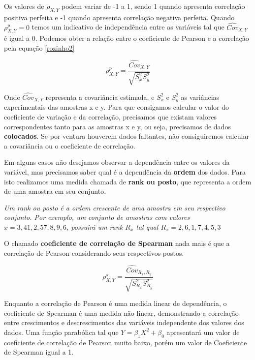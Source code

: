  Os valores de $\rho_{X,Y}$ podem variar de -1 a 1, sendo 1 quando apresenta correlação positiva perfeita e -1 quando apresenta correlação negativa perfeita. Quando $\rho_{X,Y}^{p} = 0$ temos um indicativo de independência entre as variáveis tal que $\hat{Cov}_{X,Y}$ é igual a 0. Podemos obter a relação entre o coeficiente de Pearson e a correlação pela equação \eqref{rozinho2}
 
 \begin{equation}\label{rozinho2}
 \rho_{X,Y}^{p} = \frac{\hat{Cov}_{X,Y}}{\sqrt{S_{x}^{2} S_{y}^{2}}} 
 \end{equation}
 
 Onde $\hat{Cov}_{X,Y}$ representa a covariância estimada, e $S_{x}^{2}$ e $S_{y}^{2}$ as variâncias experimentais das amostras x e y. Para que consigamos calcular o valor do coeficiente de variação e da correlação, precisamos que existam valores correspondentes tanto para as amostras x e y, ou seja, precisamos de dados \textbf{colocados}. Se por ventura houverem dados faltantes, não consiguiremos calcular a covariância ou o coeficiente de correlação. 
 
 Em alguns casos não desejamos observar a dependência entre os valores da variável, mas precisamos saber qual é a dependência da \textbf{ordem} dos dados. Para isto realizamos uma medida chamada de \textbf{rank ou posto}, que representa a ordem de uma amostra em seu conjunto. 
 
\begin{definition} 
	\textit{Um rank ou posto é a ordem crescente de uma amostra em seu respectivo conjunto. Por exemplo, um conjunto de amostras com valores $x={3,41,2,57,8,9,6}$, possuirá um rank $R_{x}$ tal qual $R_{x} = {2,6,1,7,4,5,3}$ }
\end{definition}
 
O chamado \textbf{coeficiente de correlação de Spearman} nada mais é que a correlação de Pearson considerando seus respectivos postos. 

 \begin{equation}\label{Spearman}
\rho_{X,Y}^{s} = \frac{\hat{Cov}_{R_{x},R_{y}}}{\sqrt{S_{R_{x}}^{2} S_{R_{y}}^{2}}} 
\end{equation}	 

Enquanto a correlação de Pearson é uma medida linear de dependência, o coeficiente de Spearman é uma medida não linear, demonstrando a correlação entre crescimentos e descrescimentos das variáveis independente dos valores dos dados. Uma função parabólica tal que $Y = \beta_{1} X^{2}  + \beta_{0} $ apresentará um valor de coeficiente de correlação de Pearson muito baixo, porém um valor de Coeficiente de Spearman igual a 1. 
